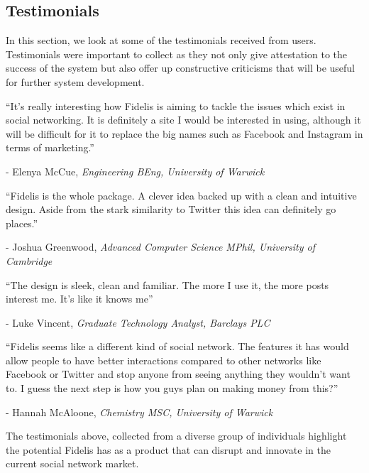 \subsection{Testimonials}
In this section, we look at some of the testimonials received from users. Testimonials were important to collect as they not only give attestation to the success of the system but also offer up constructive criticisms that will be useful for further system development.

\begin{displayquote}
    \enquote{It's really interesting how Fidelis is aiming to tackle the issues which exist in social networking. It is definitely a site I would be interested in using, although it will be difficult for it to replace the big names such as Facebook and Instagram in terms of marketing.}
    
    - Elenya McCue, \textit{Engineering BEng, University of Warwick}
\end{displayquote}

\begin{displayquote}
    \enquote{Fidelis is the whole package. A clever idea backed up with a clean and intuitive design. Aside from the stark similarity to Twitter this idea can definitely go places.}
    
    - Joshua Greenwood, \textit{Advanced Computer Science MPhil, University of Cambridge}
\end{displayquote}

\begin{displayquote}
    \enquote{The design is sleek, clean and familiar. The more I use it, the more posts interest me. It's like it knows me} 
    
    - Luke Vincent, \textit{Graduate Technology Analyst, Barclays PLC}
\end{displayquote}

\begin{displayquote}
    \enquote{Fidelis seems like a different kind of social network. The features it has would allow people to have better interactions compared to other networks like Facebook or Twitter and stop anyone from seeing anything they wouldn't want to. I guess the next step is how you guys plan on making money from this?}
    
    - Hannah McAloone, \textit{Chemistry MSC, University of Warwick}
\end{displayquote}

\noindent The testimonials above, collected from a diverse group of individuals highlight the potential Fidelis has as a product that can disrupt and innovate in the current social network market. 
